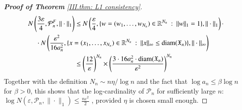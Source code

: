 \begin{proof}[\hypertarget{III.proof consistency in L1}{\textbf{Proof of Theorem} \ref{III.thm: L1 consistency}}]
\begin{align*}
N\left(  \frac{3\varepsilon }{4}, \mathcal{P}_n^{F}, \| \cdot \|_1 \right) &\leq N \left(\frac{\varepsilon}{4} , \{ w = (w_1,\ldots,w_{N_n}) \in \mathbb{R}^{N_n} \: : \: \| w \|_1 = 1 \}, \| \cdot  \|_1 \right) \cdot\\
& \hspace{-2cm} \cdot N \left(\frac{\varepsilon^2}{16a_n^2} , \{ x = (x_1,\ldots,x_{N_n}) \in \mathbb{R}^{N_n} \: : \: \| x \|_\infty \leq \text{diam}(\mathfrak{X}_n) \} , \| \cdot \|_\infty  \right)   \\
& \leq \left( \frac{12}{\varepsilon} \right)^{N_n} \times \left( \frac{3 \cdot 16  a^2_n \cdot \text{diam} (\mathfrak{X}_n)}{\varepsilon^2} \right)^{N_n}
 \end{align*}
Together with the definition $N_n \sim n \eta / \log n$ and the fact that $\log{a_n} \leq \beta \log{n}$ for $\beta >0$, this shows that the log-cardinality of $\mathcal{P}_n$ for sufficiently large $n$:  
$\log N\left(\varepsilon, \mathcal{P}_n,\|\cdot\|_1\right) \leq \frac{n \varepsilon^2}{2}$ , provided $\eta$ is chosen small enough.
\end{proof}

